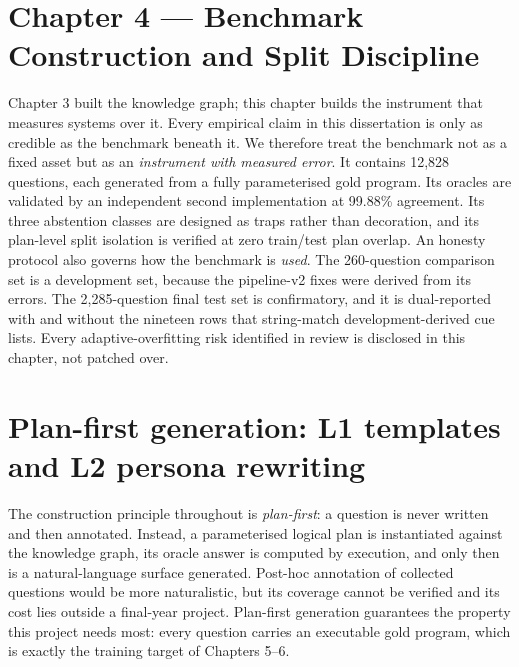 \section{Chapter 4 --- Benchmark Construction and Split Discipline}\label{sec:chapter-4-benchmark-construction-and-spl}

Chapter 3 built the knowledge graph; this chapter builds the instrument that measures systems over it. Every empirical claim in this dissertation is only as credible as the benchmark beneath it. We therefore treat the benchmark not as a fixed asset but as an \emph{instrument with measured error}. It contains 12,828 questions, each generated from a fully parameterised gold program. Its oracles are validated by an independent second implementation at 99.88\% agreement. Its three abstention classes are designed as traps rather than decoration, and its plan-level split isolation is verified at zero train/test plan overlap. An honesty protocol also governs how the benchmark is \emph{used}. The 260-question comparison set is a development set, because the pipeline-v2 fixes were derived from its errors. The 2,285-question final test set is confirmatory, and it is dual-reported with and without the nineteen rows that string-match development-derived cue lists. Every adaptive-overfitting risk identified in review is disclosed in this chapter, not patched over.

\section{Plan-first generation: L1 templates and L2 persona rewriting}\label{sec:plan-first-generation-l1-templates-and-l}

The construction principle throughout is \emph{plan-first}: a question is never written and then annotated. Instead, a parameterised logical plan is instantiated against the knowledge graph, its oracle answer is computed by execution, and only then is a natural-language surface generated. Post-hoc annotation of collected questions would be more naturalistic, but its coverage cannot be verified and its cost lies outside a final-year project. Plan-first generation guarantees the property this project needs most: every question carries an executable gold program, which is exactly the training target of Chapters 5--6.

